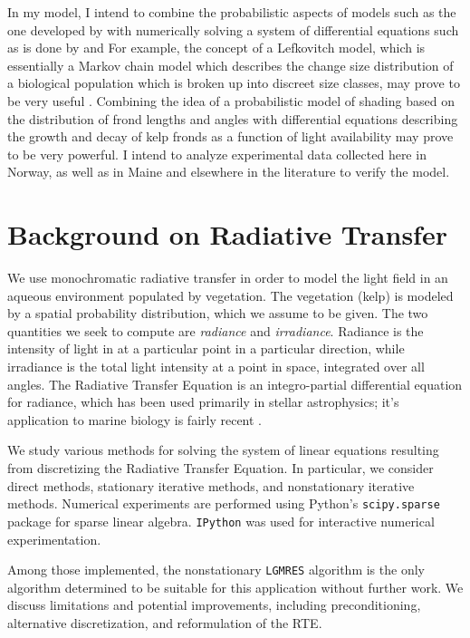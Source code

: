 In my model, I intend to combine the probabilistic aspects of models such as the one developed by \cite{burgman_stage-structured_1990} with numerically solving a system of differential equations such as is done by \cite{anderson_mathematical_1974} and \cite{broch_modelling_2012}
For example, the concept of a Lefkovitch model, which is essentially a Markov chain model which describes the change size distribution of a biological population which is broken up into discreet size classes, may prove to be very useful \cite{caswell_matrix_1983}. Combining the idea of a probabilistic model of shading based on the distribution of frond lengths and angles with differential equations describing the growth and decay of kelp fronds as a function of light availability may prove to be very powerful. I intend to analyze experimental data collected here in Norway, as well as in Maine and elsewhere in the literature to verify the model. \\[-0.75em]

\section{Background on Radiative Transfer}

We use monochromatic radiative transfer in order to model the light field in an aqueous environment populated by vegetation.
The vegetation (kelp) is modeled by a spatial probability distribution, which we assume to be given.
The two quantities we seek to compute are \textit{radiance} and \textit{irradiance}.
Radiance is the intensity of light in at a particular point in a particular direction, while irradiance is the total light intensity at a point in space, integrated over all angles.
The Radiative Transfer Equation is an integro-partial differential equation for radiance, which has been used primarily in stellar astrophysics; it's application to marine biology is fairly recent \cite{mobley_radiative_2001}.

We study various methods for solving the system of linear equations resulting from discretizing the Radiative Transfer Equation.
In particular, we consider direct methods, stationary iterative methods, and nonstationary iterative methods.
Numerical experiments are performed using Python's \texttt{scipy.sparse} \cite{jones_scipy:_2001} package for sparse linear algebra.
\texttt{IPython} \cite{perez_ipython:_2007} was used for interactive numerical experimentation.

Among those implemented, the nonstationary \texttt{LGMRES} \cite{baker_technique_2005} algorithm is the only algorithm determined to be suitable for this application without further work.
We discuss limitations and potential improvements, including preconditioning, alternative discretization, and reformulation of the RTE.


